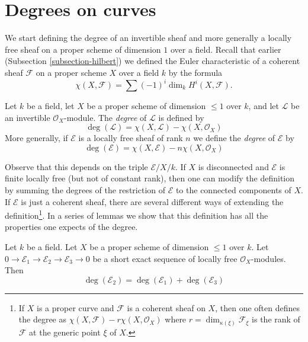 \section{Degrees on curves}
\label{section-divisors-curves}

\noindent
We start defining the degree of an invertible sheaf and more generally
a locally free sheaf on a proper scheme
of dimension $1$ over a field. Recall that earlier
(Subsection \ref{subsection-hilbert}) we defined the Euler characteristic
of a coherent sheaf $\mathcal{F}$ on a proper scheme $X$ over a field
$k$ by the formula
$$
\chi(X, \mathcal{F}) = \sum (-1)^i \dim_k H^i(X, \mathcal{F}).
$$

\begin{definition}
\label{definition-degree-invertible-sheaf}
Let $k$ be a field, let $X$ be a proper scheme of dimension $\leq 1$
over $k$, and let $\mathcal{L}$ be an invertible $\mathcal{O}_X$-module.
The {\it degree} of $\mathcal{L}$ is defined by
$$
\deg(\mathcal{L}) = \chi(X, \mathcal{L}) - \chi(X, \mathcal{O}_X)
$$
More generally, if $\mathcal{E}$ is a locally free sheaf of rank $n$
we define the {\it degree} of $\mathcal{E}$ by
$$
\deg(\mathcal{E}) = \chi(X, \mathcal{E}) - n\chi(X, \mathcal{O}_X)
$$
\end{definition}

\noindent
Observe that this depends on the triple $\mathcal{E}/X/k$.
If $X$ is disconnected and $\mathcal{E}$ is finite locally free (but not
of constant rank), then one can modify the definition by summing the degrees
of the restriction of $\mathcal{E}$ to the connected components of $X$.
If $\mathcal{E}$ is just a coherent sheaf, there are several different
ways of extending the definition\footnote{If $X$ is a proper curve
and $\mathcal{F}$ is a coherent sheaf on $X$, then one often defines
the degree as $\chi(X, \mathcal{F}) - r\chi(X, \mathcal{O}_X)$
where $r = \dim_{\kappa(\xi)} \mathcal{F}_\xi$ is the rank of $\mathcal{F}$
at the generic point $\xi$ of $X$.}.
In a series of lemmas we show that this definition has all the properties
one expects of the degree.

\begin{lemma}
\label{lemma-degree-additive}
Let $k$ be a field. Let $X$ be a proper scheme of dimension $\leq 1$
over $k$. Let $0 \to \mathcal{E}_1 \to \mathcal{E}_2 \to \mathcal{E}_3 \to 0$
be a short exact sequence of locally free $\mathcal{O}_X$-modules. Then
$$
\deg(\mathcal{E}_2) = \deg(\mathcal{E}_1) + \deg(\mathcal{E}_3)
$$
\end{lemma}

